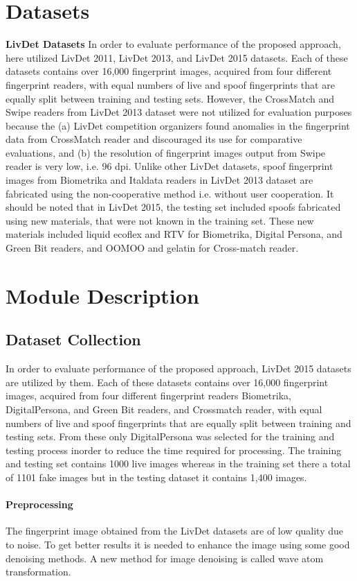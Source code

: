 \section{Datasets}
\textbf{LivDet Datasets} In order to evaluate performance of the proposed approach, here utilized LivDet 2011, LivDet 2013, and LivDet 2015 datasets. Each of these datasets contains over 16,000 fingerprint images, acquired from four different fingerprint readers, with equal numbers of live and spoof fingerprints that are equally split between training and testing sets. However, the CrossMatch and Swipe readers from LivDet 2013 dataset were not utilized for evaluation purposes because the (a) LivDet competition organizers found anomalies in the fingerprint data from CrossMatch reader and discouraged its use for comparative evaluations, and (b) the resolution of fingerprint images output from Swipe reader is very low, i.e. 96 dpi. Unlike other LivDet datasets, spoof fingerprint images from Biometrika and Italdata readers in LivDet 2013 dataset are fabricated using the non-cooperative method i.e. without user cooperation. It should be noted that in LivDet 2015, the testing set included spoofs fabricated using new materials, that were not known in the training set. These new materials included liquid ecoﬂex and RTV for Biometrika, Digital Persona, and Green Bit readers, and OOMOO and gelatin for Cross-match reader. 
\section{Module Description}
\subsection{Dataset Collection} 
In order to evaluate performance of the proposed approach, LivDet 2015 datasets are utilized by them. Each of these datasets contains over 16,000 fingerprint images, acquired from four different fingerprint readers Biometrika, DigitalPersona, and Green Bit readers, and Crossmatch reader, with equal numbers of live and spoof fingerprints that are equally split between training and testing sets. From these only DigitalPersona was selected for the training and testing process inorder to reduce the time required for processing. The training and testing set contains 1000 live images whereas in the training set there a total of 1101 fake images but in the testing dataset it contains 1,400 images.
\paragraph{Preprocessing}
The fingerprint image obtained from the LivDet datasets are of low quality due to noise. To get better results it is needed to enhance the image using some good denoising methods. A new method for image denoising is called wave atom transformation. 

